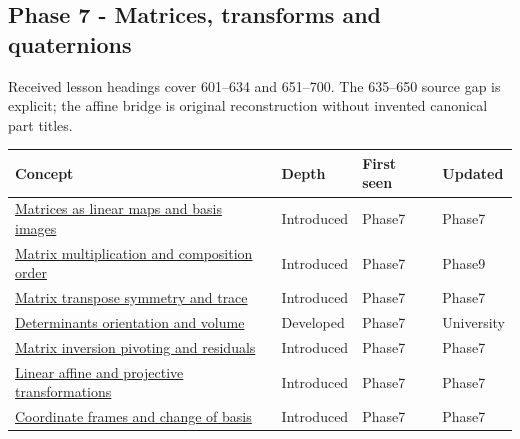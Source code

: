\subsection{Phase 7 - Matrices, transforms and quaternions}\label{appendix-a6d556a4ef50-phase-7---matrices-transforms-and-quaternions}

Received lesson headings cover 601--634 and 651--700. The 635--650 source gap is explicit; the affine bridge is original reconstruction without invented canonical part titles.

{\def\LTcaptype{none} %
\begin{longtable}[]{@{}
  >{\raggedright\arraybackslash}p{}
  >{\raggedright\arraybackslash}p{}
  >{\raggedright\arraybackslash}p{}
  >{\raggedright\arraybackslash}p{}@{}}
\toprule\noalign{}
\begin{minipage}[b]{\linewidth}\raggedright
Concept
\end{minipage} & \begin{minipage}[b]{\linewidth}\raggedright
Depth
\end{minipage} & \begin{minipage}[b]{\linewidth}\raggedright
First seen
\end{minipage} & \begin{minipage}[b]{\linewidth}\raggedright
Updated
\end{minipage} \\
\midrule\noalign{}
\endhead
\bottomrule\noalign{}
\endlastfoot
\hyperref[appendix-bd39c3bf5d64]{Matrices as linear maps and basis images} & Introduced & Phase7 & Phase7 \\
\hyperref[appendix-ab31ef447dbf]{Matrix multiplication and composition order} & Introduced & Phase7 & Phase9 \\
\hyperref[appendix-175ca5ff874d]{Matrix transpose symmetry and trace} & Introduced & Phase7 & Phase7 \\
\hyperref[appendix-da478be01d02]{Determinants orientation and volume} & Developed & Phase7 & University \\
\hyperref[appendix-48d2e66378ab]{Matrix inversion pivoting and residuals} & Introduced & Phase7 & Phase7 \\
\hyperref[appendix-0bf0ca73f735]{Linear affine and projective transformations} & Introduced & Phase7 & Phase7 \\
\hyperref[appendix-1bae9457dbc3]{Coordinate frames and change of basis} & Introduced & Phase7 & Phase7 \\

\end{longtable}}
